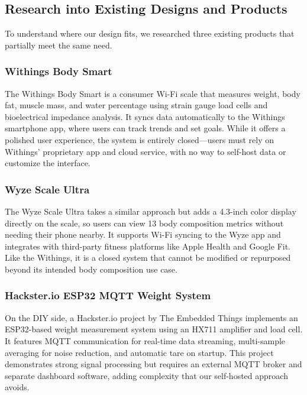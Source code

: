\subsection{Research into Existing Designs and Products}

To understand where our design fits, we researched three existing products that partially meet the same need.

\subsubsection*{Withings Body Smart}

The Withings Body Smart is a consumer Wi-Fi scale that measures weight, body fat, muscle mass, and water percentage using strain gauge load cells and bioelectrical impedance analysis. It syncs data automatically to the Withings smartphone app, where users can track trends and set goals. While it offers a polished user experience, the system is entirely closed---users must rely on Withings' proprietary app and cloud service, with no way to self-host data or customize the interface.

\subsubsection*{Wyze Scale Ultra}

The Wyze Scale Ultra takes a similar approach but adds a 4.3-inch color display directly on the scale, so users can view 13 body composition metrics without needing their phone nearby. It supports Wi-Fi syncing to the Wyze app and integrates with third-party fitness platforms like Apple Health and Google Fit. Like the Withings, it is a closed system that cannot be modified or repurposed beyond its intended body composition use case.

\subsubsection*{Hackster.io ESP32 MQTT Weight System}

On the DIY side, a Hackster.io project by The Embedded Things implements an ESP32-based weight measurement system using an HX711 amplifier and load cell. It features MQTT communication for real-time data streaming, multi-sample averaging for noise reduction, and automatic tare on startup. This project demonstrates strong signal processing but requires an external MQTT broker and separate dashboard software, adding complexity that our self-hosted approach avoids.


